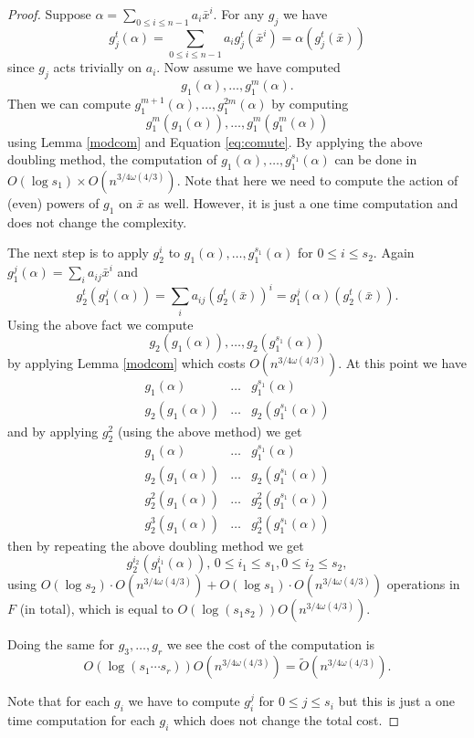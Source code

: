 \documentclass[sigconf]{acmart}
\newcommand{\osumcost}{O(n^{3/4 \omega(4/3)})}
\newcommand{\osumcosttilde}{\tilde{O}(n^{3/4 \omega(4/3)})}
\theoremstyle{acmplain}
\begin{document}
\begin{proof}
Suppose $\alpha = \sum_{0\leq i \leq n-1} a_i \bar{x}^i$. For any $g_j$ we have 
\begin{equation}\label{eq:comute}
g_j^t(\alpha) = \sum_{0\leq i \leq n-1} a_i g_j^t(\bar{x}^i) = \alpha(g_j^t(\bar{x}))
\end{equation}
since $g_j$ acts trivially on $a_i$. Now assume we have computed 
 $$g_1(\alpha), \ldots , g_1^m(\alpha).$$ Then we can compute  $g_1^{m+1}(\alpha), \ldots , g_1^{2m}(\alpha)$ by computing $$g_1^m(g_1(\alpha)), \ldots , g_1^m(g_1^m(\alpha)) $$ using Lemma \ref{modcom} and Equation \ref{eq:comute}. By applying the above 
 doubling method, the computation of $g_1(\alpha), \ldots , g_1^{s_1}(\alpha)$ can be done in $ O(\log s_1) \times \osumcost$.
 Note that here we need to compute the action of (even) powers of $g_1$ on $\bar{x}$ as well. However, it is just a one time
 computation and does not change the complexity. 

The next step is to apply $g_2^i$ to $g_1(\alpha), \ldots , g_1^{s_1}(\alpha)$ for $0\leq i \leq s_2$. Again 
$g_1^j(\alpha) = \sum_{i} a_{ij} \bar{x}^i$ and $$g_2^t(g_1^j(\alpha)) = \sum_{i} a_{ij} (g_2^t(\bar{x}))^i = g_1^j(\alpha)(g_2^t(\bar{x})).$$
Using the above fact we compute 
$$g_2(g_1(\alpha)), \ldots , g_2(g_1^{s_1}(\alpha))$$
by applying Lemma \ref{modcom} which costs $\osumcost$. At this point we have 
$$\begin{array}{lll} g_1(\alpha)& \ldots & g_1^{s_1}(\alpha)\\ g_2(g_1(\alpha))& \ldots & g_2(g_1^{s_1}(\alpha))\end{array}$$
and by applying $g_2^2$ (using the above method) we get 
$$\begin{array}{lll} g_1(\alpha)& \ldots & g_1^{s_1}(\alpha)\\ g_2(g_1(\alpha))& \ldots & g_2(g_1^{s_1}(\alpha))\\
g_2^2(g_1(\alpha))& \ldots & g_2^2(g_1^{s_1}(\alpha))\\g_2^3(g_1(\alpha))& \ldots & g_2^3(g_1^{s_1}(\alpha))
\end{array}$$
then by repeating the above doubling method we get
$$g_2^{i_2}(g_1^{i_1}(\alpha)), \, 0\leq i_1\leq s_1, 0 \leq i_2 \leq s_2,$$
using $O(\log s_2)\cdot \osumcost + O(\log s_1)\cdot \osumcost$ operations in $F$ (in total), which is equal to $O(\log (s_1s_2))\osumcost$. 

Doing the same for $g_3 , \ldots , g_r$ we see the cost of the computation is 
$$O(\log (s_1\cdots s_r))\osumcost = \osumcosttilde.$$

Note that for each $g_i$ we have to compute $g_i^j$ for $0 \leq j \leq s_i$ but this is just a one time computation for each $g_i$
which does not change the total cost.
\end{proof}
\end{document}
